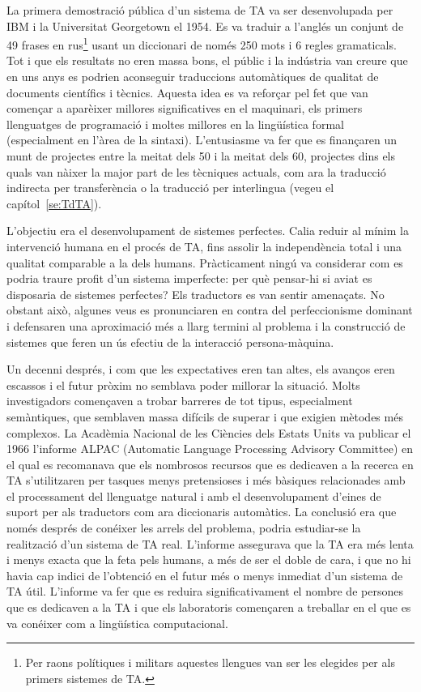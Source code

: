 La primera demostració pública d'un sistema de TA
va ser desenvolupada per IBM i la Universitat Georgetown el 1954. 
Es va traduir a l'anglés un conjunt de 49 frases en rus\footnote{Per 
raons polítiques i militars 
aquestes llengues van ser les elegides per als primers sistemes de
TA.} usant un diccionari de 
només 250 mots i 6 regles gramaticals.
Tot i que els resultats no eren massa bons, 
el públic i la indústria van creure que en uns anys es 
podrien aconseguir traduccions automàtiques de 
qualitat de documents científics i tècnics. 
Aquesta idea es va reforçar pel fet que van començar a 
aparèixer millores significatives en el maquinari, 
els primers llenguatges de programació i moltes 
millores en la lingüística formal (especialment 
en l'àrea de la sintaxi). L'entusiasme va fer que es 
finançaren un munt de projectes entre la meitat dels 50 i la meitat
dels 60, 
projectes dins els 
quals van nàixer la major part de les tècniques actuals, 
com ara la traducció indirecta per 
transferència o la traducció per interlingua (vegeu el
capítol~\ref{se:TdTA}).


L'objectiu era el desenvolupament de sistemes perfectes. Calia reduir 
al mínim la intervenció 
humana en el procés de TA, fins assolir la independència total i una 
qualitat comparable a la dels 
humans. Pràcticament ningú va considerar com es podria traure 
profit d'un sistema imperfecte: 
per què pensar-hi si aviat es disposaria de sistemes perfectes? Els
traductors es van sentir 
amenaçats. No obstant això, algunes veus es pronunciaren en contra 
del perfeccionisme dominant i 
defensaren una aproximació 
més a llarg termini al problema i 
la construcció de sistemes que feren 
un ús efectiu de la interacció persona-màquina.

Un decenni després, i com que les expectatives eren tan 
altes, els avanços eren escassos
i el futur pròxim no semblava poder millorar la situació. 
Molts investigadors començaven a 
trobar barreres de tot tipus, especialment semàntiques,
que semblaven massa difícils de superar
i que exigien mètodes més complexos. La Acadèmia Nacional de 
les Ciències dels Estats Units va publicar el 1966
l'informe ALPAC (Automatic Language Processing 
Advisory Committee) en el qual es recomanava que els nombrosos 
recursos que es dedicaven a 
la recerca en TA s'utilitzaren per tasques menys pretensioses 
i més bàsiques relacionades amb 
el processament del llenguatge natural i amb el desenvolupament 
d'eines de suport per als 
traductors com ara diccionaris automàtics.
La conclusió era que només després de conéixer les arrels del 
problema, podria estudiar-se la realització 
d'un sistema de TA real. L'informe assegurava que la TA era més 
lenta i menys exacta que la feta pels humans, 
a més de ser el doble de cara, i que no hi havia 
cap indici de l'obtenció en el futur més o menys inmediat d'un 
sistema de TA útil.
L'informe va fer que es reduira significativament el nombre de 
persones que es dedicaven a la TA i que 
els laboratoris començaren a treballar en el que es va conéixer 
com a lingüística computacional.

